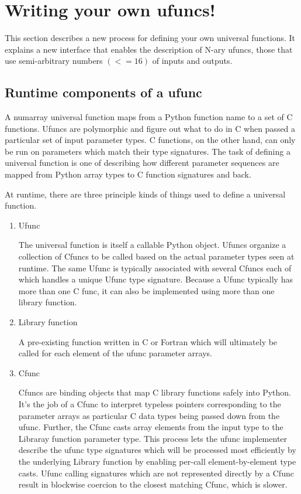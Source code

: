 \section{Writing your own ufuncs!}

This section describes a new process for defining your own universal functions.
It explains a new interface that enables the description of N-ary ufuncs, those
that use semi-arbitrary numbers \((<= 16)\) of inputs and outputs.

\subsection{Runtime components of a ufunc}

A numarray universal function maps from a Python function name to a set of C
functions.  Ufuncs are polymorphic and figure out what to do in C when passed a
particular set of input parameter types.  C functions, on the other hand, can
only be run on parameters which match their type signatures.  The task of
defining a universal function is one of describing how different parameter
sequences are mapped from Python array types to C function signatures and back.

At runtime, there are three principle kinds of things used to define a
universal function.

\begin {enumerate}
\item Ufunc 

The universal function is itself a callable Python object.  Ufuncs organize a
collection of Cfuncs to be called based on the actual parameter types seen at
runtime.  The same Ufunc is typically associated with several Cfuncs each of
which handles a unique Ufunc type signature.  Because a Ufunc typically has
more than one C func, it can also be implemented using more than one library
function.

\item Library function

A pre-existing function written in C or Fortran which will ultimately be called
for each element of the ufunc parameter arrays.  

\item Cfunc

Cfuncs are binding objects that map C library functions safely into Python.
It's the job of a Cfunc to interpret typeless pointers corresponding to the
parameter arrays as particular C data types being passed down from the ufunc.
Further, the Cfunc casts array elements from the input type to the Libraray
function parameter type.  This process lets the ufunc implementer describe the
ufunc type signatures which will be processed most efficiently by the
underlying Library function by enabling per-call element-by-element type casts.
Ufunc calling signatures which are not represented directly by a Cfunc result
in blockwise coercion to the closest matching Cfunc, which is slower.

\end {enumerate}

